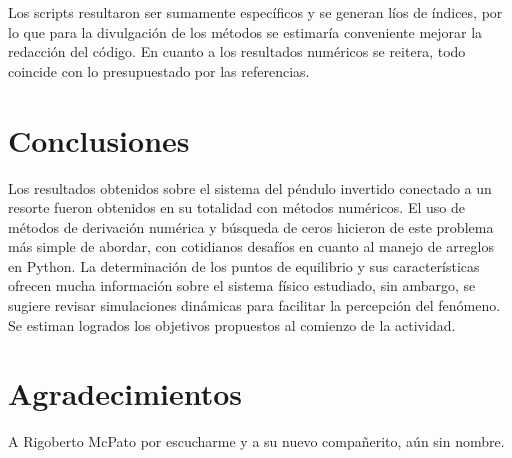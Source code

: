 \documentclass[../portafolio.tex]{subfiles}
\begin{document}
Los scripts resultaron ser sumamente específicos y se generan líos de índices, por lo que para la divulgación de los métodos se estimaría conveniente mejorar la redacción del código. En cuanto a los resultados numéricos se reitera, todo coincide con lo presupuestado por las referencias.
\section*{Conclusiones}
Los resultados obtenidos sobre el sistema del péndulo invertido conectado a un resorte fueron obtenidos en su totalidad con métodos numéricos. El uso de métodos de derivación numérica y búsqueda de ceros hicieron de este problema más simple de abordar, con cotidianos desafíos en cuanto al manejo de arreglos en Python. La determinación de los puntos de equilibrio y sus características ofrecen mucha información sobre el sistema físico estudiado, sin ambargo, se sugiere revisar simulaciones dinámicas para facilitar la percepción del fenómeno. Se estiman logrados los objetivos propuestos al comienzo de la actividad.
\section*{Agradecimientos}
A Rigoberto McPato por escucharme y a su nuevo compañerito, aún sin nombre.
\end{document}
